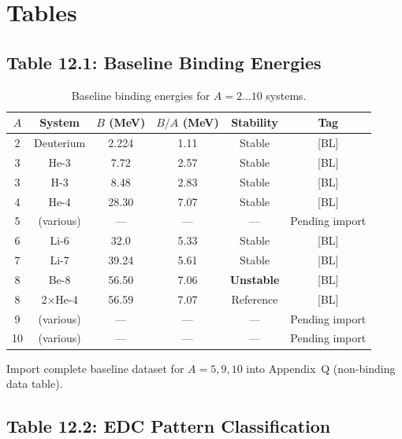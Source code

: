 \section{Tables}
\label{sec:light:tables}

\subsection{Table 12.1: Baseline Binding Energies}

\begin{table}[h]
\centering
\caption{Baseline binding energies for $A = 2 \ldots 10$ systems.}
\label{tab:baselines}
\begin{tabular}{cccccc}
    \toprule
    $A$ & System & $B$ (MeV) & $B/A$ (MeV) & Stability & Tag \\
    \midrule
    2 & Deuterium & 2.224 & 1.11 & Stable & [BL] \\
    3 & He-3 & 7.72 & 2.57 & Stable & [BL] \\
    3 & H-3 & 8.48 & 2.83 & Stable & [BL] \\
    4 & He-4 & 28.30 & 7.07 & Stable & [BL] \\
    5 & (various) & --- & --- & --- & Pending import \\
    6 & Li-6 & 32.0 & 5.33 & Stable & [BL] \\
    7 & Li-7 & 39.24 & 5.61 & Stable & [BL] \\
    8 & Be-8 & 56.50 & 7.06 & \textbf{Unstable} & [BL] \\
    8 & 2$\times$He-4 & 56.59 & 7.07 & Reference & [BL] \\
    9 & (various) & --- & --- & --- & Pending import \\
    10 & (various) & --- & --- & --- & Pending import \\
    \bottomrule
\end{tabular}
\end{table}

\begin{edcopenbox}[title=Open: Baseline Import]
    Import complete baseline dataset for $A = 5, 9, 10$ into Appendix~Q
    (non-binding data table).
    \tagOpen
\end{edcopenbox}

\subsection{Table 12.2: EDC Pattern Classification}

